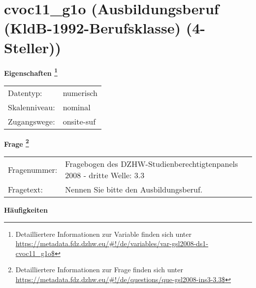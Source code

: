 
    \setcounter{footnote}{0}

    \vspace*{-1.8cm}
	\section{cvoc11\_g1o (Ausbildungsberuf (KldB-1992-Berufsklasse) (4-Steller))}
	\label{section:cvoc11_g1o}



    \vspace*{0.5cm}
    \noindent\textbf{Eigenschaften
	\footnote{Detailliertere Informationen zur Variable finden sich unter
		\url{https://metadata.fdz.dzhw.eu/\#!/de/variables/var-gsl2008-ds1-cvoc11_g1o$}}}\\
	\begin{tabularx}{\hsize}{@{}lX}
	Datentyp: & numerisch \\
	Skalenniveau: & nominal \\
	Zugangswege: &
	  onsite-suf
 \\
    \end{tabularx}



				\vspace*{0.5cm}
                \noindent\textbf{Frage
	                \footnote{Detailliertere Informationen zur Frage finden sich unter
		              \url{https://metadata.fdz.dzhw.eu/\#!/de/questions/que-gsl2008-ins3-3.3$}}}\\
				\begin{tabularx}{\hsize}{@{}lX}
					Fragenummer: &
					  Fragebogen des DZHW-Studienberechtigtenpanels 2008 - dritte Welle:
					  3.3
 \\
					Fragetext: & Nennen Sie bitte den Ausbildungsberuf. \\
				\end{tabularx}





        		\vspace*{0.5cm}
                \noindent\textbf{Häufigkeiten}


